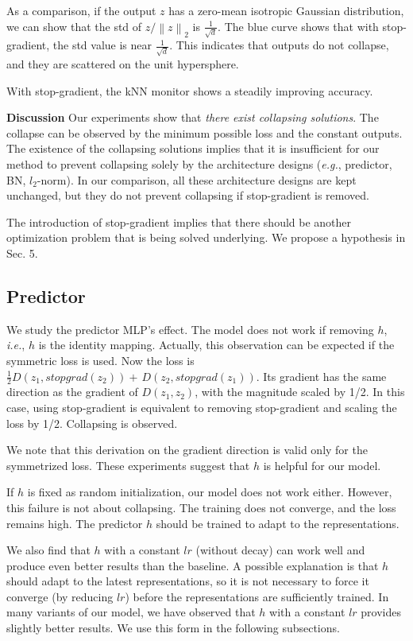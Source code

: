 \documentclass[conference]{IEEEtran}
\begin{document}
As a comparison, if the output $z$ has a zero-mean isotropic Gaussian distribution, we can show that the std of $z/\left\lVert z \right\rVert_2$ is $\frac{1}{\sqrt{d}}$. The blue curve shows that with stop-gradient, the std value is near $\frac{1}{\sqrt{d}}$. 
This indicates that outputs do not collapse, and they are scattered on the unit hypersphere.

With stop-gradient, the kNN monitor shows a steadily improving accuracy. 

\textbf{Discussion} Our experiments show that \textit{there exist collapsing solutions}. The collapse can be observed by the minimum possible loss and the constant outputs.
The existence of the collapsing solutions implies that it is insufficient for our method to prevent collapsing solely by the architecture designs (\textit{e.g.}, predictor, BN, $l_2$-norm).
In our comparison, all these architecture designs are kept unchanged, but they do not prevent collapsing if stop-gradient is removed.

The introduction of stop-gradient implies that there should be another optimization problem that is being solved underlying. We propose a hypothesis in Sec. 5.

\subsection{Predictor} We study the predictor MLP's effect.
The model does not work if removing $h$, \textit{i.e.}, $h$ is the identity mapping. Actually, this observation can be expected if the symmetric loss is used.
Now the loss is $\frac{1}{2}D(z_1, stopgrad(z_2)) + \frac{}{}D(z_2, stopgrad(z_1))$. Its gradient has the same direction as the gradient of $D(z_1, z_2)$, with the magnitude scaled by 1/2.
In this case, using stop-gradient is equivalent to removing stop-gradient and scaling the loss by 1/2. Collapsing is observed.

We note that this derivation on the gradient direction is valid only for the symmetrized loss. These experiments suggest that $h$ is helpful for our model.

If $h$ is fixed as random initialization, our model does not work either. However, this failure is not about collapsing. The training does not converge, and the loss remains high. The predictor $h$ should be trained to adapt to the representations.

We also find that $h$ with a constant $lr$ (without decay) can work well and produce even better results than the baseline. A possible explanation is that $h$ should adapt to the latest representations, so it is not necessary to force it converge (by reducing $lr$) before the representations are sufficiently trained.
In many variants of our model, we have observed that $h$ with a constant $lr$ provides slightly better results. We use this form in the following subsections.
\end{document}
